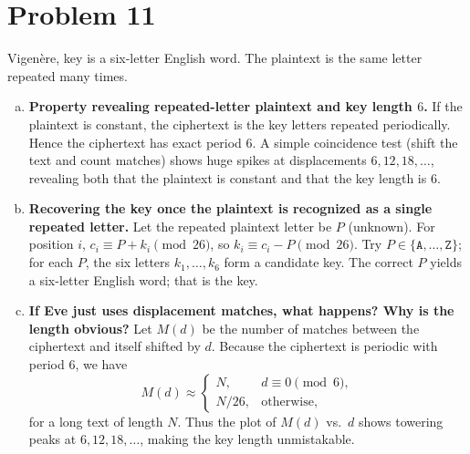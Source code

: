 \section*{Problem 11}

Vigen\`ere, key is a six-letter English word. The plaintext is the same letter repeated many times.

\begin{enumerate}[(a)]
\item \textbf{Property revealing repeated-letter plaintext and key length $6$.}
If the plaintext is constant, the ciphertext is the key letters repeated periodically.
Hence the ciphertext has exact period $6$. A simple coincidence test (shift the text and count matches) shows huge spikes at displacements $6,12,18,\ldots$, revealing both that the plaintext is constant and that the key length is $6$.

\item \textbf{Recovering the key once the plaintext is recognized as a single repeated letter.}
Let the repeated plaintext letter be $P$ (unknown). For position $i$,
$c_i \equiv P + k_i \pmod{26}$, so $k_i \equiv c_i - P \pmod{26}$.
Try $P\in\{\texttt{A},\dots,\texttt{Z}\}$; for each $P$, the six letters
$k_1,\dots,k_6$ form a candidate key. The correct $P$ yields a six-letter English word; that is the key.

\item \textbf{If Eve just uses displacement matches, what happens? Why is the length obvious?}
Let $M(d)$ be the number of matches between the ciphertext and itself shifted by $d$.
Because the ciphertext is periodic with period $6$, we have
\[
M(d)\approx
\begin{cases}
N, & d\equiv 0 \pmod{6},\\
N/26, & \text{otherwise},
\end{cases}
\]
for a long text of length $N$. Thus the plot of $M(d)$ vs.\ $d$ shows towering peaks at $6,12,18,\ldots$, making the key length unmistakable.
\end{enumerate}
